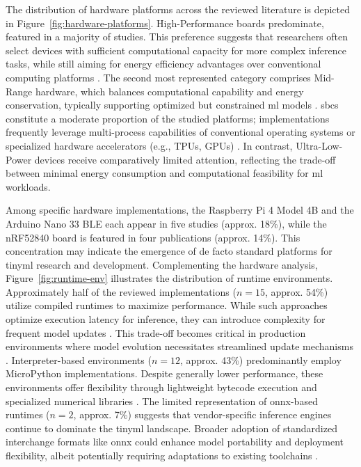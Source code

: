 The distribution of hardware platforms across the reviewed literature is depicted in Figure~\ref{fig:hardware-platforms}. High-Performance boards predominate, featured in a majority of studies. This preference suggests that researchers often select devices with sufficient computational capacity for more complex inference tasks, while still aiming for energy efficiency advantages over conventional computing platforms \cite{tekinReviewOndeviceMachine2024}. The second most represented category comprises Mid-Range hardware, which balances computational capability and energy conservation, typically supporting optimized but constrained \gls{ml} models \cite{davidTensorFlowLiteMicro2021}. \Glspl{sbc} constitute a moderate proportion of the studied platforms; implementations frequently leverage multi-process capabilities of conventional operating systems or specialized hardware accelerators (e.g., TPUs, GPUs) \cite{tekinReviewOndeviceMachine2024}. In contrast, Ultra-Low-Power devices receive comparatively limited attention, reflecting the trade-off between minimal energy consumption and computational feasibility for \gls{ml} workloads.

Among specific hardware implementations, the Raspberry Pi 4 Model 4B and the Arduino Nano 33 BLE each appear in five studies (approx. 18\%), while the nRF52840 board is featured in four publications (approx. 14\%). This concentration may indicate the emergence of de facto standard platforms for \gls{tinyml} research and development.
Complementing the hardware analysis, Figure~\ref{fig:runtime-env} illustrates the distribution of runtime environments. Approximately half of the reviewed implementations ($n=15$, approx. 54\%) utilize compiled runtimes to maximize performance. While such approaches optimize execution latency for inference, they can introduce complexity for frequent model updates \cite{banburyEdgeImpulseMLOps2023}. This trade-off becomes critical in production environments where model evolution necessitates streamlined update mechanisms \cite{lootusVMContainerizedApproach2022}. Interpreter-based environments ($n=12$, approx. 43\%) predominantly employ MicroPython implementations. Despite generally lower performance, these environments offer flexibility through lightweight bytecode execution and specialized numerical libraries \cite{antoniniTinyMLOpsFrameworkOrchestrating2022}. The limited representation of \gls{onnx}-based runtimes ($n=2$, approx. 7\%) suggests that vendor-specific inference engines continue to dominate the \gls{tinyml} landscape. Broader adoption of standardized interchange formats like \gls{onnx} could enhance model portability and deployment flexibility, albeit potentially requiring adaptations to existing toolchains \cite{fraidlingTinyMachineLearning2023}.

